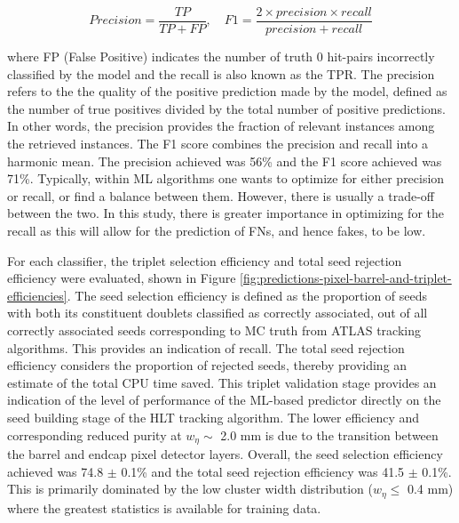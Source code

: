 \begin{equation}
    Precision = \frac{TP}{TP + FP}, \quad F1 = \frac{2 \times precision \times recall}{precision + recall}
\end{equation}

where FP (False Positive) indicates the number of truth 0 hit-pairs incorrectly classified by the model and the recall is also known as the TPR. The precision refers to the the quality of the positive prediction made by the model, defined as the number of true positives divided by the total number of positive predictions. In other words, the precision provides the fraction of relevant instances among the retrieved instances. The F1 score combines the precision and recall into a harmonic mean. The precision achieved was 56\% and the F1 score achieved was 71\%. Typically, within ML algorithms one wants to optimize for either precision or recall, or find a balance between them. However, there is usually a trade-off between the two. In this study, there is greater importance in optimizing for the recall as this will allow for the prediction of FNs, and hence fakes, to be low.


For each classifier, the triplet selection efficiency and total seed rejection efficiency were evaluated, shown in Figure \ref{fig:predictions-pixel-barrel-and-triplet-efficiencies}. The seed selection efficiency is defined as the proportion of seeds with both its constituent doublets classified as correctly associated, out of all correctly associated seeds corresponding to MC truth from ATLAS tracking algorithms. This provides an indication of recall. The total seed rejection efficiency considers the proportion of rejected seeds, thereby providing an estimate of the total CPU time saved. This triplet validation stage provides an indication of the level of performance of the ML-based predictor directly on the seed building stage of the HLT tracking algorithm. The lower efficiency and corresponding reduced purity at $w_{\eta} \sim$ 2.0 mm is due to the transition between the barrel and endcap pixel detector layers. Overall, the seed selection efficiency achieved was 74.8 $\pm$ 0.1\% and the total seed rejection efficiency was 41.5 $\pm$ 0.1\%. This is primarily dominated by the low cluster width distribution ($w_{\eta} \leq$ 0.4 mm) where the greatest statistics is available for training data.




